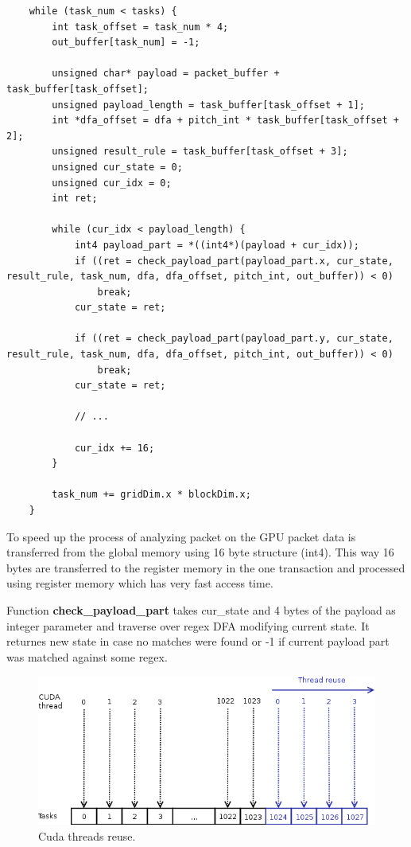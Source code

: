 \documentclass[thesis=M,english]{FITthesis}[2011/07/15]
\begin{document}
\begin{lstlisting}
    while (task_num < tasks) {
        int task_offset = task_num * 4;
        out_buffer[task_num] = -1;

        unsigned char* payload = packet_buffer + task_buffer[task_offset];
        unsigned payload_length = task_buffer[task_offset + 1];
        int *dfa_offset = dfa + pitch_int * task_buffer[task_offset + 2];
        unsigned result_rule = task_buffer[task_offset + 3];
        unsigned cur_state = 0;
        unsigned cur_idx = 0;
        int ret;

        while (cur_idx < payload_length) {
            int4 payload_part = *((int4*)(payload + cur_idx));
            if ((ret = check_payload_part(payload_part.x, cur_state, result_rule, task_num, dfa, dfa_offset, pitch_int, out_buffer)) < 0)
                break;
            cur_state = ret;

            if ((ret = check_payload_part(payload_part.y, cur_state, result_rule, task_num, dfa, dfa_offset, pitch_int, out_buffer)) < 0)
                break;
            cur_state = ret;

            // ...

            cur_idx += 16;
        }

        task_num += gridDim.x * blockDim.x;
    }
\end{lstlisting}

To speed up the process of analyzing packet on the GPU packet data is transferred from the global memory using 16 byte structure (int4). This way 16 bytes are transferred to the register memory in the one transaction and processed using register memory which has very fast access time.

Function \textbf{check\_payload\_part} takes cur\_state and 4 bytes of the payload as integer parameter and traverse over regex DFA modifying current state. It returnes new state in case no matches were found or -1 if current payload part was matched against some regex.

\begin{figure}[h]
\centering
\includegraphics[scale=0.5]{images/cuda_thread_reuse.png}
\caption{Cuda threads reuse.}
\label{fig:cuda_thread_reuse}
\end{figure}
\end{document}
